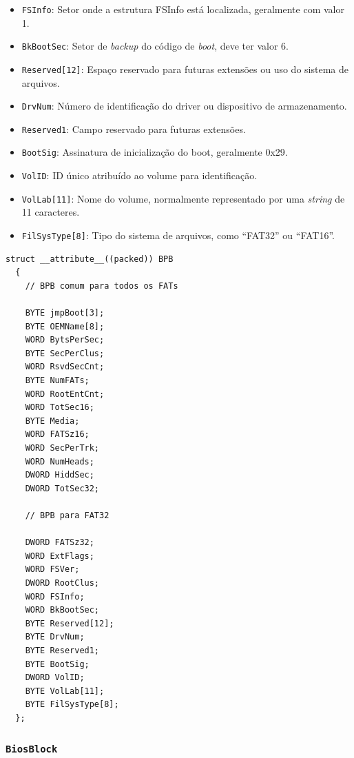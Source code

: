 \documentclass[
    12pt,				%
    oneside,   	        %
    a4paper,			%
    english,			%
    french,				%
    spanish,			%
    brazil,				%
    ]{pacotes/abntex2}
\begin{document}
\begin{itemize}
\begin{itemize}
            \item \texttt{FSInfo}: Setor onde a estrutura FSInfo está localizada, geralmente com valor 1.
            \item \texttt{BkBootSec}: Setor de \textit{backup} do código de \textit{boot}, deve ter valor 6.
            \item \texttt{Reserved[12]}: Espaço reservado para futuras extensões ou uso do sistema de arquivos.
            \item \texttt{DrvNum}: Número de identificação do driver ou dispositivo de armazenamento.
            \item \texttt{Reserved1}: Campo reservado para futuras extensões.
            \item \texttt{BootSig}: Assinatura de inicialização do boot, geralmente 0x29.
            \item \texttt{VolID}: ID único atribuído ao volume para identificação.
            \item \texttt{VolLab[11]}: Nome do volume, normalmente representado por uma \textit{string} de 11 caracteres.
            \item \texttt{FilSysType[8]}: Tipo do sistema de arquivos, como ``FAT32'' ou ``FAT16''.
        \end{itemize}
\end{itemize}

\begin{lstlisting}[caption={Estrutura que representa o BPB encontrado no volume FAT}, label={lst:bpb}]
  struct __attribute__((packed)) BPB
  {
    // BPB comum para todos os FATs
    
    BYTE jmpBoot[3];
    BYTE OEMName[8];
    WORD BytsPerSec;
    BYTE SecPerClus;
    WORD RsvdSecCnt;
    BYTE NumFATs;
    WORD RootEntCnt;
    WORD TotSec16;
    BYTE Media;
    WORD FATSz16;
    WORD SecPerTrk;
    WORD NumHeads;
    DWORD HiddSec;
    DWORD TotSec32;
    
    // BPB para FAT32

    DWORD FATSz32;
    WORD ExtFlags;
    WORD FSVer;
    DWORD RootClus;
    WORD FSInfo;
    WORD BkBootSec;
    BYTE Reserved[12];
    BYTE DrvNum;
    BYTE Reserved1;
    BYTE BootSig;
    DWORD VolID;
    BYTE VolLab[11];
    BYTE FilSysType[8];
  };
\end{lstlisting}

\subsubsection{\texttt{BiosBlock}}
\label{subsubsec:bios_block}
\end{document}
